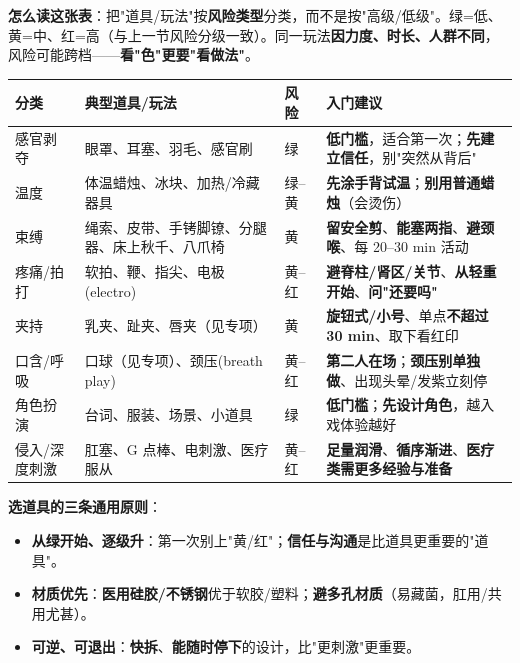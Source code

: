 \documentclass[12pt,UTF8,openany]{ctexbook}
\begin{document}
\textbf{怎么读这张表}：把"道具/玩法"按\textbf{风险类型}分类，而不是按"高级/低级"。绿=低、黄=中、红=高（与上一节风险分级一致）。同一玩法\textbf{因力度、时长、人群不同}，风险可能跨档——\textbf{看"色"更要"看做法"}。

\begin{tabularx}{\textwidth}{l X l X}
\toprule
\textbf{分类} & \textbf{典型道具/玩法} & \textbf{风险} & \textbf{入门建议} \\
\midrule
感官剥夺 & 眼罩、耳塞、羽毛、感官刷 & 绿 & \textbf{低门槛}，适合第一次；\textbf{先建立信任}，别"突然从背后" \\
温度 & 体温蜡烛、冰块、加热/冷藏器具 & 绿--黄 & \textbf{先涂手背试温}；\textbf{别用普通蜡烛}（会烫伤） \\
束缚 & 绳索、皮带、手铐脚镣、分腿器、床上秋千、八爪椅 & 黄 & \textbf{留安全剪}、\textbf{能塞两指}、\textbf{避颈喉}、每 20--30 min 活动 \\
疼痛/拍打 & 软拍、鞭、指尖、电极(electro) & 黄--红 & \textbf{避脊柱/肾区/关节}、\textbf{从轻重开始}、\textbf{问"还要吗"} \\
夹持 & 乳夹、趾夹、唇夹（见专项） & 黄 & \textbf{旋钮式/小号}、单点\textbf{不超过 30 min}、取下看红印 \\
口含/呼吸 & 口球（见专项）、颈压(breath play) & 黄--红 & \textbf{第二人在场}；\textbf{颈压别单独做}、出现头晕/发紫立刻停 \\
角色扮演 & 台词、服装、场景、小道具 & 绿 & \textbf{低门槛}；\textbf{先设计角色}，越入戏体验越好 \\
侵入/深度刺激 & 肛塞、G 点棒、电刺激、医疗服从 & 黄--红 & \textbf{足量润滑}、\textbf{循序渐进}、\textbf{医疗类需更多经验与准备} \\
\bottomrule
\end{tabularx}

\vspace{0.5em}
\noindent\textbf{选道具的三条通用原则}：
\begin{itemize}[leftmargin=2em,itemsep=0.3em]
  \item \textbf{从绿开始、逐级升}：第一次别上"黄/红"；\textbf{信任与沟通}是比道具更重要的"道具"。
  \item \textbf{材质优先}：\textbf{医用硅胶/不锈钢}优于软胶/塑料；\textbf{避多孔材质}（易藏菌，肛用/共用尤甚）。
  \item \textbf{可逆、可退出}：\textbf{快拆}、\textbf{能随时停下}的设计，比"更刺激"更重要。
\end{itemize}
\end{document}
